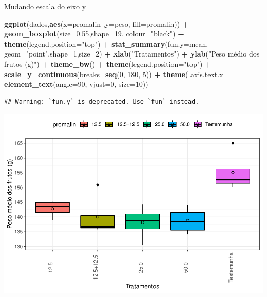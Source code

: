 \documentclass[
]{book}
\newenvironment{Shaded}{\begin{snugshade}}{\end{snugshade}}
\newcommand{\DataTypeTok}[1]{\textcolor[rgb]{0.13,0.29,0.53}{#1}}
\newcommand{\DecValTok}[1]{\textcolor[rgb]{0.00,0.00,0.81}{#1}}
\newcommand{\FloatTok}[1]{\textcolor[rgb]{0.00,0.00,0.81}{#1}}
\newcommand{\KeywordTok}[1]{\textcolor[rgb]{0.13,0.29,0.53}{\textbf{#1}}}
\newcommand{\NormalTok}[1]{#1}
\newcommand{\OperatorTok}[1]{\textcolor[rgb]{0.81,0.36,0.00}{\textbf{#1}}}
\newcommand{\StringTok}[1]{\textcolor[rgb]{0.31,0.60,0.02}{#1}}
\begin{document}
Mudando escala do eixo y

\begin{Shaded}
\begin{Highlighting}[]
\KeywordTok{ggplot}\NormalTok{(dados,}\KeywordTok{aes}\NormalTok{(}\DataTypeTok{x=}\NormalTok{promalin ,}\DataTypeTok{y=}\NormalTok{peso, }\DataTypeTok{fill=}\NormalTok{promalin)) }\OperatorTok{+}\StringTok{ }
\StringTok{      }\KeywordTok{geom_boxplot}\NormalTok{(}\DataTypeTok{size=}\FloatTok{0.55}\NormalTok{,}\DataTypeTok{shape=}\DecValTok{19}\NormalTok{, }\DataTypeTok{colour=}\StringTok{"black"}\NormalTok{) }\OperatorTok{+}\StringTok{ }
\StringTok{      }\KeywordTok{theme}\NormalTok{(}\DataTypeTok{legend.position=}\StringTok{"top"}\NormalTok{) }\OperatorTok{+}\StringTok{ }
\StringTok{      }\KeywordTok{stat_summary}\NormalTok{(}\DataTypeTok{fun.y=}\NormalTok{mean, }\DataTypeTok{geom=}\StringTok{"point"}\NormalTok{,}\DataTypeTok{shape=}\DecValTok{1}\NormalTok{,}\DataTypeTok{size=}\DecValTok{2}\NormalTok{) }\OperatorTok{+}\StringTok{ }
\StringTok{      }\KeywordTok{xlab}\NormalTok{(}\StringTok{"Tratamentos"}\NormalTok{) }\OperatorTok{+}\StringTok{  }
\StringTok{      }\KeywordTok{ylab}\NormalTok{(}\StringTok{"Peso médio dos frutos (g)"}\NormalTok{)  }\OperatorTok{+}
\StringTok{      }\KeywordTok{theme_bw}\NormalTok{() }\OperatorTok{+}
\StringTok{      }\KeywordTok{theme}\NormalTok{(}\DataTypeTok{legend.position=}\StringTok{"top"}\NormalTok{) }\OperatorTok{+}
\StringTok{      }\KeywordTok{scale_y_continuous}\NormalTok{(}\DataTypeTok{breaks=}\KeywordTok{seq}\NormalTok{(}\DecValTok{0}\NormalTok{, }\DecValTok{180}\NormalTok{, }\DecValTok{5}\NormalTok{)) }\OperatorTok{+}
\StringTok{      }\KeywordTok{theme}\NormalTok{( }\DataTypeTok{axis.text.x  =} \KeywordTok{element_text}\NormalTok{(}\DataTypeTok{angle=}\DecValTok{90}\NormalTok{, }\DataTypeTok{vjust=}\DecValTok{0}\NormalTok{, }\DataTypeTok{size=}\DecValTok{10}\NormalTok{))}
\end{Highlighting}
\end{Shaded}

\begin{verbatim}
## Warning: `fun.y` is deprecated. Use `fun` instead.
\end{verbatim}

\includegraphics{TudodoR_files/figure-latex/unnamed-chunk-239-1.pdf}
\end{document}
